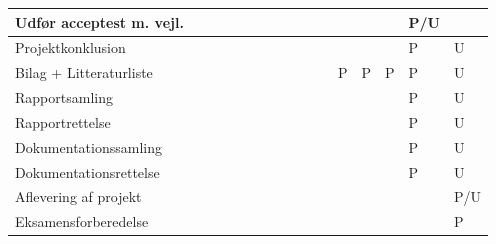 \documentclass[landscape, 12pt, letterpaper]{article}
\begin{document}
\begin{table}[]
\begin{tabular}{|l|l|l|l|l|l|l|l|l|l|l|l|l|l|l|l|}
Udfør acceptest m. vejl.&    &    &    &    &    &    &    &    &    &    &    &    &    & P/U&    \\ \hline
Projektkonklusion       &    &    &    &    &    &    &    &    &    &    &    &    &    & P  &  U \\ \hline
Bilag + Litteraturliste &    &    &    &    &    &    &    &    &    &    &  P & P  &  P &  P &  U \\ \hline
Rapportsamling          &    &    &    &    &    &    &    &    &    &    &    &    &    &  P &  U \\ \hline
Rapportrettelse         &    &    &    &    &    &    &    &    &    &    &    &    &    &  P &  U \\ \hline
Dokumentationssamling   &    &    &    &    &    &    &    &    &    &    &    &    &    &  P &  U \\ \hline
Dokumentationsrettelse  &    &    &    &    &    &    &    &    &    &    &    &    &    &  P &  U \\ \hline
Aflevering af projekt   &    &    &    &    &    &    &    &    &    &    &    &    &    &    & P/U \\ \hline
Eksamensforberedelse    &    &    &    &    &    &    &    &    &    &    &    &    &    &    &  P \\ \hline

\end{tabular}
\end{table}
\end{document}
